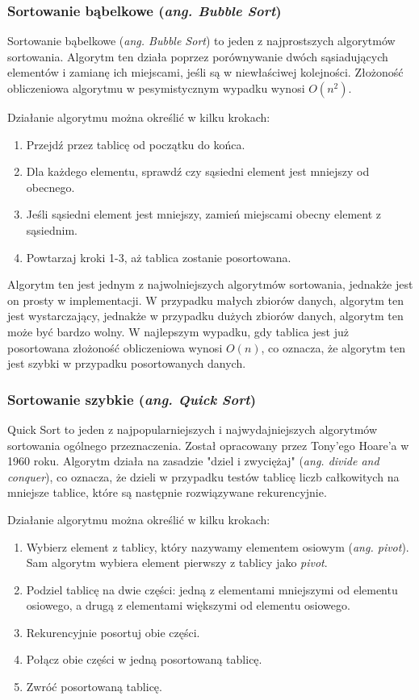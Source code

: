 \subsubsection{Sortowanie bąbelkowe (\textit{ang. Bubble Sort})}
Sortowanie bąbelkowe (\textit{ang. Bubble Sort}) to jeden z najprostszych algorytmów sortowania. Algorytm ten działa poprzez porównywanie dwóch sąsiadujących elementów i zamianę ich miejscami, jeśli są w niewłaściwej kolejności. Złożoność obliczeniowa algorytmu w pesymistycznym wypadku wynosi $O(n^2)$.

Działanie algorytmu można określić w kilku krokach:
\begin{enumerate}
  \item Przejdź przez tablicę od początku do końca.
  \item Dla każdego elementu, sprawdź czy sąsiedni element jest mniejszy od obecnego.
  \item Jeśli sąsiedni element jest mniejszy, zamień miejscami obecny element z sąsiednim.
  \item Powtarzaj kroki 1-3, aż tablica zostanie posortowana.
\end{enumerate}

Algorytm ten jest jednym z najwolniejszych algorytmów sortowania, jednakże jest on prosty w implementacji. W przypadku małych zbiorów danych, algorytm ten jest wystarczający, jednakże w przypadku dużych zbiorów danych, algorytm ten może być bardzo wolny. W najlepszym wypadku, gdy tablica jest już posortowana złożoność obliczeniowa wynosi $O(n)$, co oznacza, że algorytm ten jest szybki w przypadku posortowanych danych.

\subsubsection{Sortowanie szybkie (\textit{ang. Quick Sort})}
Quick Sort to jeden z najpopularniejszych i najwydajniejszych algorytmów sortowania ogólnego przeznaczenia. Został opracowany przez Tony'ego Hoare'a w 1960 roku. Algorytm działa na zasadzie "dziel i zwyciężaj" (\textit{ang. divide and conquer}), co oznacza, że dzieli w przypadku testów tablicę liczb całkowitych na mniejsze tablice, które są następnie rozwiązywane rekurencyjnie.

Działanie algorytmu można określić w kilku krokach:
\begin{enumerate}
  \item Wybierz element z tablicy, który nazywamy elementem osiowym (\textit{ang. pivot}). Sam algorytm wybiera element pierwszy z tablicy jako \textit{pivot}.
  \item Podziel tablicę na dwie części: jedną z elementami mniejszymi od elementu osiowego, a drugą z elementami większymi od elementu osiowego.
  \item Rekurencyjnie posortuj obie części.
  \item Połącz obie części w jedną posortowaną tablicę.
  \item Zwróć posortowaną tablicę.
\end{enumerate}

